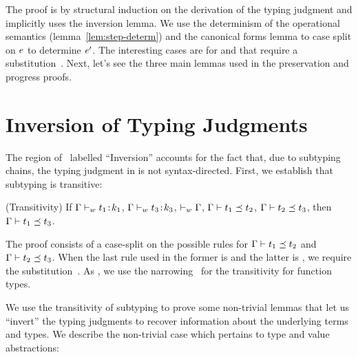 The proof is by structural induction on the 
derivation of the typing judgment and implicitly uses the 
inversion lemma. 
We use the determinism of the operational 
semantics (lemma~\ref{lem:step-determ}) and 
the canonical forms lemma to case split 
on $e$ to determine $e'$.
%
The interesting cases are for \fApp and \fTApp that require 
a substitution~.
%
Next, let's see the three main lemmas used in 
the preservation and progress proofs.

\section{Inversion of Typing Judgments}
\label{sec:soundness:inversion}

The region of~ labelled ``Inversion''
accounts for the fact that, due to subtyping
chains, the typing judgment in \sysrf is not
syntax-directed.
%
%
First, we establish that subtyping is transitive:

\begin{lemma} (Transitivity) \label{lem:transitivity} 
    If\; ${\mathrm{\Gamma}} \vdash_w {t_1\!} : {\! k_1}$,
       ${\mathrm{\Gamma}} \vdash_w {t_3\!} : {\! k_3}$,
       $\vdash_w {\mathrm{\Gamma}}$,
       ${\mathrm{\Gamma}} \vdash t_1 \preceq t_2$, 
       ${\mathrm{\Gamma}} \vdash t_2 \preceq t_3$, then
       ${\mathrm{\Gamma}} \vdash t_1 \preceq t_3$.
\end{lemma}
%
The proof consists of a case-split
on the possible rules for ${\mathrm{\Gamma}} \vdash t_1 \preceq t_2$
and ${\mathrm{\Gamma}} \vdash t_2 \preceq t_3$.
%
When the last rule used
in the former is \sWitn and the
latter is \sBind, we require the
substitution~.
%
As \citet{Aydemir05},
we use the narrowing~
for the transitivity for function types.

%
We use the transitivity of subtyping to prove
some non-trivial lemmas that let us ``invert''
the typing judgments to recover information
about the underlying terms and types.
%
We describe the non-trivial case which
pertains to type and value abstractions:

